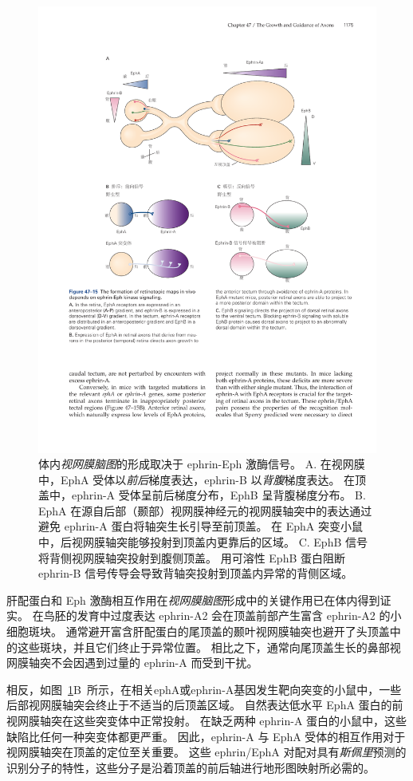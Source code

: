 \begin{figure}[htbp]
	\centering
	\includegraphics[width=0.85\linewidth]{chap47/fig_47_15}
	\caption{体内\textit{视网膜脑图}的形成取决于 ephrin-Eph 激酶信号。
		A. 在视网膜中，EphA 受体以\textit{前后}梯度表达，ephrin-B 以\textit{背腹}梯度表达。
		在顶盖中，ephrin-A 受体呈前后梯度分布，EphB 呈背腹梯度分布。
		B. EphA 在源自后部（颞部）视网膜神经元的视网膜轴突中的表达通过避免 ephrin-A 蛋白将轴突生长引导至前顶盖。
		在 EphA 突变小鼠中，后视网膜轴突能够投射到顶盖内更靠后的区域。
		C. EphB 信号将背侧视网膜轴突投射到腹侧顶盖。
		用可溶性 EphB 蛋白阻断 ephrin-B 信号传导会导致背轴突投射到顶盖内异常的背侧区域。}
	\label{fig:47_15}
\end{figure}


肝配蛋白和 Eph 激酶相互作用在\textit{视网膜脑图}形成中的关键作用已在体内得到证实。
在鸟胚的发育中过度表达 ephrin-A2 会在顶盖前部产生富含 ephrin-A2 的小细胞斑块。
通常避开富含肝配蛋白的尾顶盖的颞叶视网膜轴突也避开了头顶盖中的这些斑块，并且它们终止于异常位置。
相比之下，通常向尾顶盖生长的鼻部视网膜轴突不会因遇到过量的 ephrin-A 而受到干扰。


相反，如图~\ref{fig:47_15}B~所示，在相关ephA或ephrin-A基因发生靶向突变的小鼠中，一些后部视网膜轴突会终止于不适当的后顶盖区域。
自然表达低水平 EphA 蛋白的前视网膜轴突在这些突变体中正常投射。
在缺乏两种 ephrin-A 蛋白的小鼠中，这些缺陷比任何一种突变体都更严重。
因此，ephrin-A 与 EphA 受体的相互作用对于视网膜轴突在顶盖的定位至关重要。
这些 ephrin/EphA 对配对具有\textit{斯佩里}预测的识别分子的特性，这些分子是沿着顶盖的前后轴进行地形图映射所必需的。


